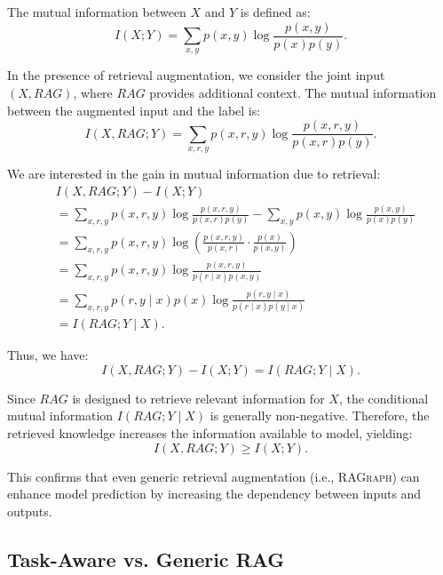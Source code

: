 \documentclass[letterpaper]{article} %
\begin{document}
The mutual information between $X$ and $Y$ is defined as:
\begin{equation}
I(X; Y) = \sum_{x, y} p(x, y) \log \frac{p(x, y)}{p(x) p(y)}.
\end{equation}

In the presence of retrieval augmentation, we consider the joint input $(X, RAG)$, where $RAG$ provides additional context. The mutual information between the augmented input and the label is:
\begin{equation}
I(X, RAG; Y) = \sum_{x, r, y} p(x, r, y) \log \frac{p(x, r, y)}{p(x, r) p(y)}.
\end{equation}

We are interested in the gain in mutual information due to retrieval:
\begin{equation}
\begin{aligned}
&I(X, RAG; Y) - I(X; Y) \\&= \sum_{x, r, y} p(x, r, y) \log \frac{p(x, r, y)}{p(x, r) p(y)} - \sum_{x, y} p(x, y) \log \frac{p(x, y)}{p(x) p(y)} \\
&= \sum_{x, r, y} p(x, r, y) \log \left( \frac{p(x, r, y)}{p(x, r)} \cdot \frac{p(x)}{p(x, y)} \right) \\
&= \sum_{x, r, y} p(x, r, y) \log \frac{p(x, r, y)}{p(r \mid x) p(x, y)} \\
&= \sum_{x, r, y} p(r, y \mid x) p(x) \log \frac{p(r, y \mid x)}{p(r \mid x) p(y \mid x)} \\
&= I(RAG; Y \mid X).
\end{aligned}
\end{equation}

Thus, we have:
\begin{equation}
{I(X, RAG; Y) - I(X; Y) = I(RAG; Y \mid X)}.
\end{equation}

Since $RAG$ is designed to retrieve relevant information for $X$, the conditional mutual information $I(RAG; Y \mid X)$ is generally non-negative. Therefore, the retrieved knowledge increases the information available to model, yielding:
\begin{equation}
{I(X, RAG; Y) \geq I(X; Y)}.
\end{equation}

This confirms that even generic retrieval augmentation (i.e., \textsc{RAGraph}) can enhance model prediction by increasing the dependency between inputs and outputs.

\subsection{Task-Aware vs. Generic RAG}
\end{document}
